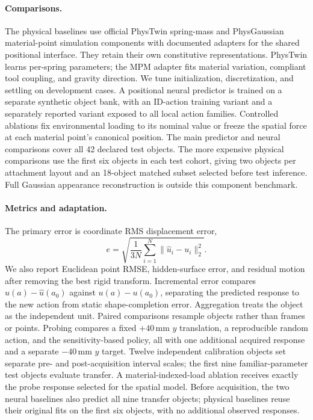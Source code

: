 \paragraph{Comparisons.}
The physical baselines use official PhysTwin spring-mass and PhysGaussian material-point simulation components with documented adapters for the shared positional interface. They retain their own constitutive representations. PhysTwin learns per-spring parameters; the MPM adapter fits material variation, compliant tool coupling, and gravity direction. We tune initialization, discretization, and settling on development cases. A positional neural predictor is trained on a separate synthetic object bank, with an ID-action training variant and a separately reported variant exposed to all local action families. Controlled ablations fix environmental loading to its nominal value or freeze the spatial force at each material point's canonical position. The main predictor and neural comparisons cover all 42 declared test objects. The more expensive physical comparisons use the first six objects in each test cohort, giving two objects per attachment layout and an 18-object matched subset selected before test inference. Full Gaussian appearance reconstruction is outside this component benchmark.

\paragraph{Metrics and adaptation.}
The primary error is coordinate RMS displacement error,
\begin{equation}
 e=\sqrt{\frac{1}{3N}\sum_{i=1}^N\|\hat u_i-u_i\|_2^2}.
\end{equation}
We also report Euclidean point RMSE, hidden-surface error, and residual motion after removing the best rigid transform. Incremental error compares $\hat u(a)-\hat u(a_0)$ against $u(a)-u(a_0)$, separating the predicted response to the new action from static shape-completion error. Aggregation treats the object as the independent unit. Paired comparisons resample objects rather than frames or points. Probing compares a fixed $+40$\,mm $y$ translation, a reproducible random action, and the sensitivity-based policy, all with one additional acquired response and a separate $-40$\,mm $y$ target. Twelve independent calibration objects set separate pre- and post-acquisition interval scales; the first nine familiar-parameter test objects evaluate transfer. A material-indexed-load ablation receives exactly the probe response selected for the spatial model. Before acquisition, the two neural baselines also predict all nine transfer objects; physical baselines reuse their original fits on the first six objects, with no additional observed responses.

